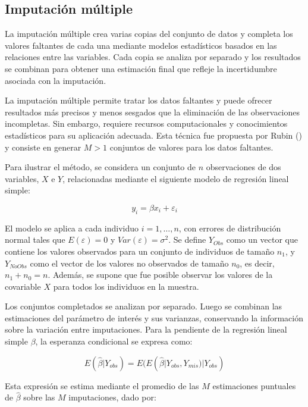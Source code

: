 \documentclass[
  spanish,
  11pt,
  letterpaper,
  oneside,
  open=any]{scrbook}
\begin{document}
\subsection{Imputación múltiple}\label{imputaciuxf3n-muxfaltiple}

La imputación múltiple crea varias copias del conjunto de datos y
completa los valores faltantes de cada una mediante modelos estadísticos
basados en las relaciones entre las variables. Cada copia se analiza por
separado y los resultados se combinan para obtener una estimación final
que refleje la incertidumbre asociada con la imputación.

La imputación múltiple permite tratar los datos faltantes y puede
ofrecer resultados más precisos y menos sesgados que la eliminación de
las observaciones incompletas. Sin embargo, requiere recursos
computacionales y conocimientos estadísticos para su aplicación
adecuada. Esta técnica fue propuesta por Rubin
() y consiste en generar \(M > 1\)
conjuntos de valores para los datos faltantes.

Para ilustrar el método, se considera un conjunto de \(n\) observaciones
de dos variables, \(X\) e \(Y\), relacionadas mediante el siguiente
modelo de regresión lineal simple:

\[y_i = \beta x_i + \varepsilon_i\]

El modelo se aplica a cada individuo \(i = 1, \ldots, n\), con errores
de distribución normal tales que \(E(\varepsilon) = 0\) y
\(Var(\varepsilon) = \sigma ^2\). Se define \(Y_{Obs}\) como un vector
que contiene los valores observados para un conjunto de individuos de
tamaño \(n_1\), y \(Y_{NoObs}\) como el vector de los valores no
observados de tamaño \(n_0\), es decir, \(n_1 + n_0 = n\). Además, se
supone que fue posible observar los valores de la covariable \(X\) para
todos los individuos en la muestra.

Los conjuntos completados se analizan por separado. Luego se combinan
las estimaciones del parámetro de interés y sus varianzas, conservando
la información sobre la variación entre imputaciones. Para la pendiente
de la regresión lineal simple \(\beta\), la esperanza condicional se
expresa como:

\[E(\hat{\beta} | Y_{obs}) = E(E(\hat{\beta} | Y_{obs}, Y_{mis}) | Y_{obs})\]

Esta expresión se estima mediante el promedio de las \(M\) estimaciones
puntuales de \(\hat{\beta}\) sobre las \(M\) imputaciones, dado por:
\end{document}
